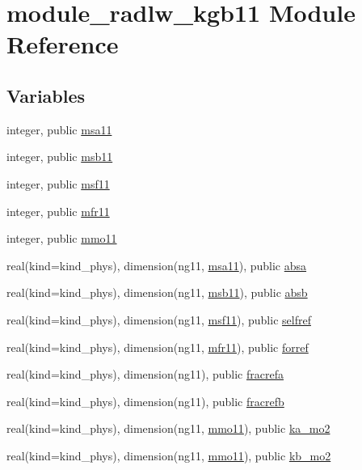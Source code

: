 \hypertarget{namespacemodule__radlw__kgb11}{}\section{module\+\_\+radlw\+\_\+kgb11 Module Reference}
\label{namespacemodule__radlw__kgb11}
\subsection*{Variables}
\begin{DoxyCompactItemize}
\item 
integer, public \hyperlink{namespacemodule__radlw__kgb11_afd15a7b87b3d49c53c12e023c604b360}{msa11}
\item 
integer, public \hyperlink{group__module__radlw__main_gaa8630868015cb7e358107e6418e35276}{msb11}
\item 
integer, public \hyperlink{group__module__radlw__main_ga7dcec9b9f19a3f5f13d443572d834628}{msf11}
\item 
integer, public \hyperlink{group__module__radlw__main_ga9b5764441999cce52bc02e65a24420b9}{mfr11}
\item 
integer, public \hyperlink{group__module__radlw__main_ga6aabd24aa785ef8689c63b01aaaab243}{mmo11}
\item 
real(kind=kind\+\_\+phys), dimension(ng11, \hyperlink{namespacemodule__radlw__kgb11_afd15a7b87b3d49c53c12e023c604b360}{msa11}), public \hyperlink{group__module__radlw__main_ga7ac883387aa86a635c9aea011c55a1d5}{absa}
\item 
real(kind=kind\+\_\+phys), dimension(ng11, \hyperlink{group__module__radlw__main_gaa8630868015cb7e358107e6418e35276}{msb11}), public \hyperlink{group__module__radlw__main_gacf37465675961812e07616e42b137d70}{absb}
\item 
real(kind=kind\+\_\+phys), dimension(ng11, \hyperlink{group__module__radlw__main_ga7dcec9b9f19a3f5f13d443572d834628}{msf11}), public \hyperlink{group__module__radlw__main_gac98edefcce668d56c3aadc241863741f}{selfref}
\item 
real(kind=kind\+\_\+phys), dimension(ng11, \hyperlink{group__module__radlw__main_ga9b5764441999cce52bc02e65a24420b9}{mfr11}), public \hyperlink{group__module__radlw__main_ga9239d06fcd3fca0f13302c1ae4eb5a60}{forref}
\item 
real(kind=kind\+\_\+phys), dimension(ng11), public \hyperlink{group__module__radlw__main_ga5bf6552fb9c1e7c35729b2aea885306e}{fracrefa}
\item 
real(kind=kind\+\_\+phys), dimension(ng11), public \hyperlink{group__module__radlw__main_ga0a89a2686ebc70a2c0d8577b89384a56}{fracrefb}
\item 
real(kind=kind\+\_\+phys), dimension(ng11, \hyperlink{group__module__radlw__main_ga6aabd24aa785ef8689c63b01aaaab243}{mmo11}), public \hyperlink{group__module__radlw__main_ga8791eb290525c0d08fefa33ca23569c8}{ka\+\_\+mo2}
\item 
real(kind=kind\+\_\+phys), dimension(ng11, \hyperlink{group__module__radlw__main_ga6aabd24aa785ef8689c63b01aaaab243}{mmo11}), public \hyperlink{group__module__radlw__main_gaebc48e152bb90794b6d0b426f6c5f9e4}{kb\+\_\+mo2}
\end{DoxyCompactItemize}


